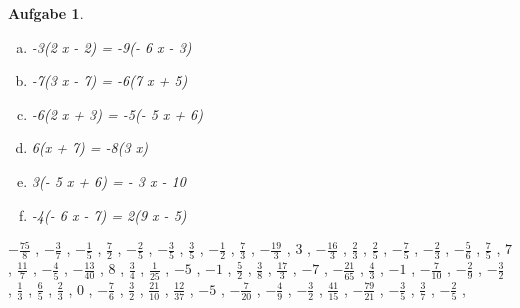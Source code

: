 \documentclass[12pt]{article}
\theoremstyle{note}
\newtheorem{aufgabe}{Aufgabe}
\begin{document}
\begin{flushleft}
\begin{aufgabe}
\begin{multicols}{2}
\begin{enumerate}[a)]
\item 
-3(2 x - 2) = -9(- 6 x - 3)
\item 
-7(3 x - 7) = -6(7 x + 5)
\item 
-6(2 x + 3) = -5(- 5 x + 6)
\item 
6(x + 7) = -8(3 x)
\item 
3(- 5 x + 6) = - 3 x - 10
\item 
-4(- 6 x - 7) = 2(9 x - 5)
\end{enumerate} 
\end{multicols} 
\end{aufgabe} 
$ \scriptstyle- \frac{75}{8}$ , $ \scriptstyle- \frac{3}{7}$ , $ \scriptstyle- \frac{1}{5}$ , $ \scriptstyle\frac{7}{2}$ , $ \scriptstyle- \frac{2}{5}$ , $ \scriptstyle- \frac{3}{5}$ , $ \scriptstyle\frac{3}{5}$ , $ \scriptstyle- \frac{1}{2}$ , $ \scriptstyle\frac{7}{3}$ , $ \scriptstyle- \frac{19}{3}$ , $ \scriptstyle3$ , $ \scriptstyle- \frac{16}{3}$ , $ \scriptstyle\frac{2}{3}$ , $ \scriptstyle\frac{2}{5}$ , $ \scriptstyle- \frac{7}{5}$ , $ \scriptstyle- \frac{2}{3}$ , $ \scriptstyle- \frac{5}{6}$ , $ \scriptstyle\frac{7}{5}$ , $ \scriptstyle7$ , $ \scriptstyle\frac{11}{7}$ , $ \scriptstyle- \frac{4}{5}$ , $ \scriptstyle- \frac{13}{40}$ , $ \scriptstyle8$ , $ \scriptstyle\frac{3}{4}$ , $ \scriptstyle\frac{1}{25}$ , $ \scriptstyle-5$ , $ \scriptstyle-1$ , $ \scriptstyle\frac{5}{2}$ , $ \scriptstyle\frac{3}{8}$ , $ \scriptstyle\frac{17}{3}$ , $ \scriptstyle-7$ , $ \scriptstyle- \frac{21}{65}$ , $ \scriptstyle\frac{4}{3}$ , $ \scriptstyle-1$ , $ \scriptstyle- \frac{7}{10}$ , $ \scriptstyle- \frac{2}{9}$ , $ \scriptstyle- \frac{3}{2}$ , $ \scriptstyle\frac{1}{3}$ , $ \scriptstyle\frac{6}{5}$ , $ \scriptstyle\frac{2}{3}$ , $ \scriptstyle0$ , $ \scriptstyle- \frac{7}{6}$ , $ \scriptstyle\frac{3}{2}$ , $ \scriptstyle\frac{21}{10}$ , $ \scriptstyle\frac{12}{37}$ , $ \scriptstyle-5$ , $ \scriptstyle- \frac{7}{20}$ , $ \scriptstyle- \frac{4}{9}$ , $ \scriptstyle- \frac{3}{2}$ , $ \scriptstyle\frac{41}{15}$ , $ \scriptstyle- \frac{79}{21}$ , $ \scriptstyle- \frac{3}{5}$ , $ \scriptstyle\frac{3}{7}$ , $ \scriptstyle- \frac{2}{5}$ , \\[0.2em] 

\end{flushleft}
\end{document}
